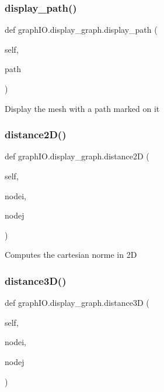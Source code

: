 \mbox{\label{classgraph_i_o_1_1display__graph_a16e2edb2ff0a29891861356ee70138b0}} 
\subsubsection{display\+\_\+path()}
{\footnotesize\ttfamily def graph\+I\+O.\+display\+\_\+graph.\+display\+\_\+path (\begin{DoxyParamCaption}\item[{}]{self,  }\item[{}]{path }\end{DoxyParamCaption})}

\begin{DoxyVerb}Display the mesh with a path marked on it
\end{DoxyVerb}
 \mbox{\label{classgraph_i_o_1_1display__graph_a63bdf36d35f077eb73abdb2bf0a7140e}} 
\subsubsection{distance2\+D()}
{\footnotesize\ttfamily def graph\+I\+O.\+display\+\_\+graph.\+distance2D (\begin{DoxyParamCaption}\item[{}]{self,  }\item[{}]{nodei,  }\item[{}]{nodej }\end{DoxyParamCaption})}

\begin{DoxyVerb}Computes the cartesian norme in 2D
\end{DoxyVerb}
 \mbox{\label{classgraph_i_o_1_1display__graph_a05bf3472530788eec304a3326815025c}} 
\subsubsection{distance3\+D()}
{\footnotesize\ttfamily def graph\+I\+O.\+display\+\_\+graph.\+distance3D (\begin{DoxyParamCaption}\item[{}]{self,  }\item[{}]{nodei,  }\item[{}]{nodej }\end{DoxyParamCaption})}

